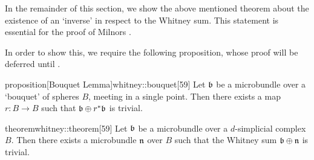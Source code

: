 \begin{myparagraph}
    In the remainder of this section, we show the above mentioned theorem about the
    existence of an `inverse' in respect to the Whitney sum.
    This statement is essential for the proof of Milnors .

    In order to show this, we require the following proposition,
    whose proof will be deferred until .

\end{myparagraph}

\begin{mystatement}{proposition}[Bouquet Lemma]{whitney::bouquet}[59]
    Let $\bb$ be a microbundle over a `bouquet' of spheres $B$, meeting in a single point.
    Then there exists a map $r: B \to B$ such that $\whitney{\bb}{\ind{r}\bb}$ is trivial.
\end{mystatement}

\begin{mystatement}{theorem}{whitney::theorem}[59]
    Let $\bb$ be a microbundle over a $d$-simplicial complex $B$.
    Then there exists a microbundle $\mathfrak{n}$ over $B$ such that
    the Whitney sum $\whitney{\bb}{\bn}$ is trivial.
\end{mystatement}

